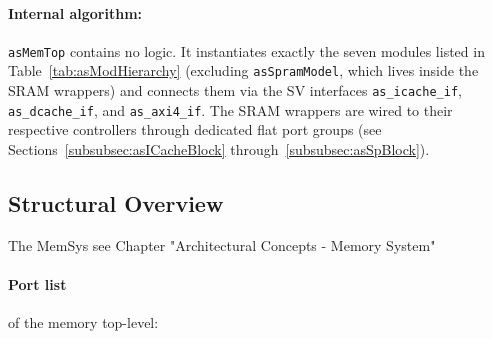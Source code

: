 \paragraph{Internal algorithm:}
\texttt{asMemTop} contains no logic.
It instantiates exactly the seven modules listed in
Table~\ref{tab:asModHierarchy} (excluding \texttt{asSpramModel}, which
lives inside the SRAM wrappers) and connects them via the SV interfaces
\texttt{as\_icache\_if}, \texttt{as\_dcache\_if}, and \texttt{as\_axi4\_if}.
The SRAM wrappers are wired to their respective controllers through
dedicated flat port groups (see Sections~\ref{subsubsec:asICacheBlock}
through~\ref{subsubsec:asSpBlock}).

\subsection{Structural Overview}
The MemSys  see Chapter "Architectural Concepts - Memory System"

\paragraph{Port list} of the memory top-level:

